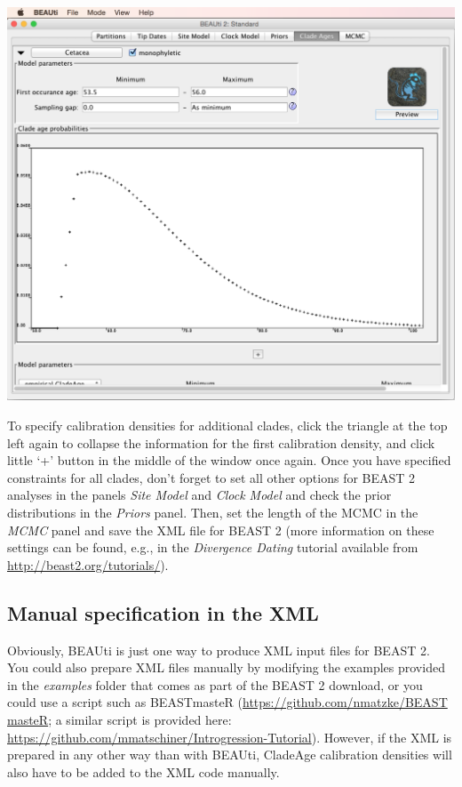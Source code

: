 \documentclass{article}
\begin{document}
\begin{center}\includegraphics[width=\textwidth]{fig10.png}\end{center}

\noindent
To specify calibration densities for additional clades, click the triangle at the top left again to collapse the information for the first calibration density, and click little `+' button in the middle of the window once again. Once you have specified constraints for all clades, don't forget to set all other options for BEAST 2 analyses in the panels \emph{Site Model} and \emph{Clock Model} and check the prior distributions in the \emph{Priors} panel. Then, set the length of the MCMC in the \emph{MCMC} panel and save the XML file for BEAST 2 (more information on these settings can be found, e.g., in the \emph{Divergence Dating} tutorial available from \href{http://beast2.org/tutorials/}{http://beast2.org/tutorials/}).

\subsection{Manual specification in the XML}\label{manual_spec}

Obviously, BEAUti is just one way to produce XML input files for BEAST 2. You could also prepare XML files manually by modifying the examples provided in the \emph{examples} folder that comes as part of the BEAST 2 download, or you could use a script such as BEASTmasteR (\href{https://github.com/nmatzke/BEASTmasteR}{https://github.com/nmatzke/BEAST\- masteR}; a similar script is provided here: \href{https://github.com/mmatschiner/Introgression-Tutorial}{https://github.com/mmatschiner/\allowbreak Introgression-Tutorial}). However, if the XML is prepared in any other way than with BEAUti, CladeAge calibration densities will also have to be added to the XML code manually.
\end{document}
